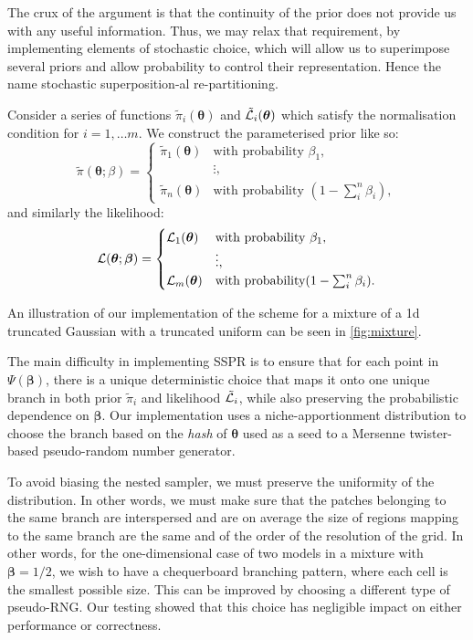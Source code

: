\documentclass[usenatbib]{mnras}
\begin{document}
The crux of the argument is that the continuity of the prior does
not provide us with any useful information. Thus, we may relax
that requirement, by implementing elements of stochastic choice,
which will allow us to superimpose several priors and allow
probability to control their representation. Hence the name
stochastic superposition-al re-partitioning.

Consider a series of functions \(\tilde{\pi}_{i}(\bm{\theta})\)
and \({\cal \tilde{L}}_{i}(\bm{\theta})\) which satisfy the
normalisation condition for \(i = 1, \ldots m\). We construct the
parameterised prior like so:
\begin{equation*}
  \tilde{\pi}(\bm{\theta}; \beta)  = \begin{cases}
	\tilde{\pi}_{1}(\bm{\theta}) & \text{with probability } \beta_{1},\\
	& \vdots,\\
	\tilde{\pi}_{n}(\bm{\theta}) & \text{with probability } (1- \sum_{i}^{n}\beta_{i}),
	\end{cases}
\end{equation*}
and similarly the likelihood:
\begin{equation*}
  {\cal L}(\bm{\theta}; \bm{\beta})  = \begin{cases}
	{\cal L}_{1}(\bm{\theta}) &  \text{with probability } \beta_{1},\\
		    &\vdots,\\
	{\cal L}_{m}(\bm{\theta}) & \text{with probability} (1- \sum_{i}^{n}\beta_{i}).
	\end{cases}
\end{equation*}

An illustration of our implementation of the scheme for a mixture
of a 1d truncated Gaussian with a truncated uniform can be seen in
\cref{fig:mixture}.

The main difficulty in implementing SSPR is to ensure that
for each point in \(\Psi(\bm{\beta})\), there is a unique deterministic choice
that maps it onto one unique branch in both prior
\(\tilde{\pi}_{i}\) and likelihood \(\tilde{\cal L}_{i}\), while also
preserving the probabilistic dependence on \(\bm{\beta}\). Our
implementation uses a niche-apportionment distribution to choose
the branch based on the \emph{hash} of \(\bm{\theta}\) used as a seed to
a Mersenne twister-based pseudo-random number generator.

To avoid biasing the nested sampler, we must preserve the
uniformity of the distribution. In other words, we must make sure
that the patches belonging to the same branch are interspersed and
are on average the size of regions mapping to the same branch are
the same and of the order of the resolution of the grid. In other
words, for the one-dimensional case of two models in a mixture
with \(\bm{\beta}=1/2\), we wish to have a chequerboard branching
pattern, where each cell is the smallest possible size. This
can be improved by choosing a different type of pseudo-RNG. Our
testing showed that this choice has negligible impact on either
performance or correctness.
\end{document}
